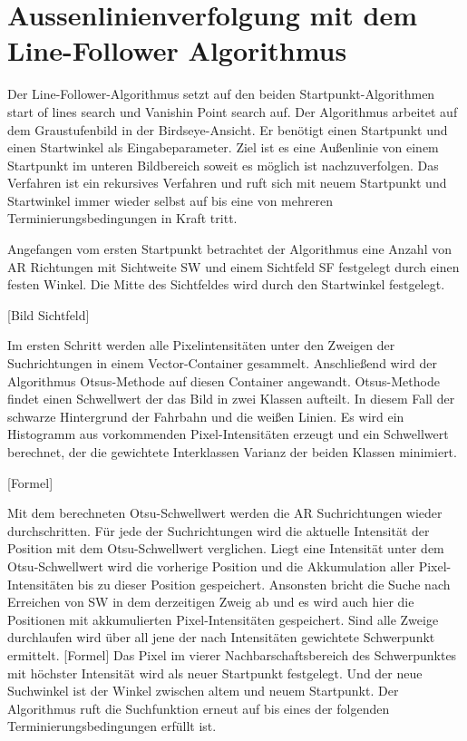 %

\chapter{Aussenlinienverfolgung mit dem Line-Follower Algorithmus}
\label{cha:Aussenlinienverfolgung mit dem Line-Follower Algorithmus} 
%
%

Der Line-Follower-Algorithmus setzt auf den beiden Startpunkt-Algorithmen start of lines search und Vanishin Point search auf. 
Der Algorithmus arbeitet auf dem Graustufenbild in der Birdseye-Ansicht.
Er ben{\"o}tigt einen Startpunkt und einen Startwinkel als Eingabeparameter. 
Ziel ist es eine Au{\ss}enlinie von einem Startpunkt im unteren Bildbereich soweit es m{\"o}glich ist nachzuverfolgen. Das Verfahren ist ein rekursives Verfahren und ruft sich mit neuem Startpunkt und Startwinkel immer wieder selbst auf bis eine von mehreren Terminierungsbedingungen in Kraft tritt.

Angefangen vom ersten Startpunkt betrachtet der Algorithmus eine Anzahl von AR Richtungen mit Sichtweite SW und einem Sichtfeld SF festgelegt durch einen festen Winkel.
Die Mitte des Sichtfeldes wird durch den Startwinkel festgelegt.

[Bild Sichtfeld]

Im ersten Schritt werden alle Pixelintensit{\"a}ten unter den Zweigen der Suchrichtungen in einem Vector-Container gesammelt.
Anschlie{\ss}end wird der Algorithmus Otsus-Methode auf diesen Container angewandt.
Otsus-Methode findet einen Schwellwert der das Bild in zwei Klassen aufteilt.
In diesem Fall der schwarze Hintergrund der Fahrbahn und die wei{\ss}en Linien.
Es wird ein Histogramm aus vorkommenden Pixel-Intensit{\"a}ten erzeugt und ein Schwellwert berechnet, der die gewichtete Interklassen Varianz der beiden Klassen minimiert. 

[Formel]

Mit dem berechneten Otsu-Schwellwert werden die AR Suchrichtungen wieder durchschritten. F{\"u}r jede der Suchrichtungen wird die aktuelle Intensit{\"a}t der Position mit dem Otsu-Schwellwert verglichen. Liegt eine Intensit{\"a}t unter dem Otsu-Schwellwert wird die vorherige Position und die Akkumulation aller Pixel-Intensit{\"a}ten bis zu dieser Position gespeichert. Ansonsten bricht die Suche nach Erreichen von SW in dem derzeitigen Zweig ab und es wird auch hier die Positionen mit akkumulierten Pixel-Intensit{\"a}ten gespeichert.
Sind alle Zweige durchlaufen wird {\"u}ber all jene der nach Intensit{\"a}ten gewichtete Schwerpunkt ermittelt.
[Formel]
Das Pixel im vierer Nachbarschaftsbereich des Schwerpunktes mit h{\"o}chster Intensit{\"a}t wird als neuer Startpunkt festgelegt. Und der neue Suchwinkel ist der Winkel zwischen altem und neuem Startpunkt. Der Algorithmus ruft die Suchfunktion erneut auf bis eines der folgenden Terminierungsbedingungen erf{\"u}llt ist. 

